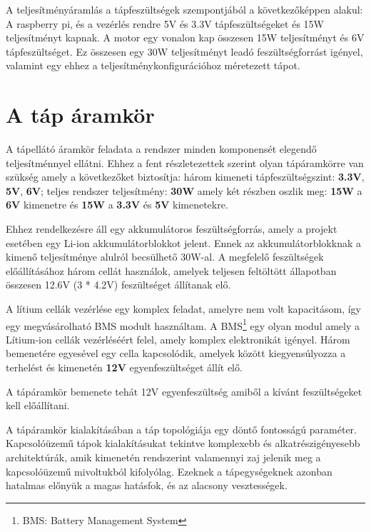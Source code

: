 
A teljesítményáramlás a tápfeszültségek szempontjából a következőképpen alakul:
A raspberry pi, és a vezérlés rendre 5V és 3.3V tápfeszültségeket és 15W
teljesítményt kapnak. A motor egy vonalon kap összesen 15W teljesítményt és 6V
tápfeszültséget. Ez összesen egy 30W teljesítményt leadó feszültségforrást
igényel, valamint egy ehhez a teljesítménykonfigurációhoz méretezett tápot.

\section{A táp áramkör}

A tápellátó áramkör feladata a rendszer minden komponensét elegendő
teljesítménnyel ellátni. Ehhez a fent részletezettek szerint olyan tápáramkörre
van szükség amely a következőket biztosítja: három kimeneti tápfeszültségszint:
\textbf{3.3V}, \textbf{5V}, \textbf{6V}; teljes rendszer teljesítmény:
\textbf{30W} amely két részben oszlik meg: \textbf{15W} a \textbf{6V} kimenetre
és \textbf{15W} a \textbf{3.3V} és \textbf{5V} kimenetekre.

Ehhez rendelkezésre áll egy akkumulátoros feszültségforrás, amely a projekt
esetében egy Li-ion akkumulátorblokkot jelent. Ennek az akkumulátorblokknak a
kimenő teljesítménye alulról becsülhető 30W-al. A megfelelő feszültségek
előállításához három cellát használok, amelyek teljesen feltöltött állapotban
összesen 12.6V (3 * 4.2V) feszültséget állítanak elő.

A lítium cellák vezérlése egy komplex feladat, amelyre nem volt kapacitásom,
így egy megvásárolható BMS modult használtam. A BMS\footnote{BMS: Battery
Management System} egy olyan modul amely a Lítium-ion cellák vezérléséért felel,
amely komplex elektronikát igényel. Három bemenetére egyesével egy cella
kapcsolódik, amelyek között kiegyensúlyozza a terhelést és kimenetén \textbf{12V}
egyenfeszültséget állít elő.

A tápáramkör bemenete tehát 12V egyenfeszültség amiből a kívánt feszültségeket
kell előállítani. 


A tápáramkör kialakításában a táp topológiája egy döntő fontosságú paraméter.
Kapcsolóüzemű tápok kialakításukat tekintve komplexebb és alkatrészigényesebb
architektúrák, amik kimenetén rendszerint valamennyi zaj jelenik meg a
kapcsolóüzemű mivoltukból kifolyólag. Ezeknek a tápegységeknek azonban hatalmas
előnyük a magas hatásfok, és az alacsony vesztességek.

